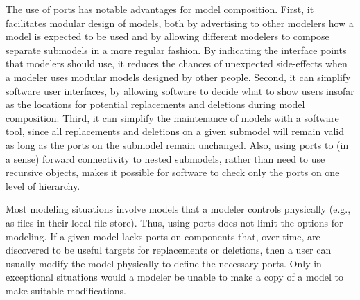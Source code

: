 The use of ports has notable advantages for model composition.  First,
it facilitates modular design of models, both by advertising to other
modelers how a model is expected to be used and by allowing different
modelers to compose separate submodels in a more regular fashion.  By
indicating the interface points that modelers should use, it reduces the
chances of unexpected side-effects when a modeler uses modular models
designed by other people.  Second, it can simplify software user
interfaces, by allowing software to decide what to show users insofar as
the locations for potential replacements and deletions during model
composition.  Third, it can simplify the maintenance of models with a
software tool, since all replacements and deletions on a given submodel
will remain valid as long as the ports on the submodel remain unchanged.
Also, using ports to (in a sense) forward connectivity to nested
submodels, rather than need to use recursive \SBaseRef objects, makes it
possible for software to check only the ports on one level of hierarchy.

Most modeling situations involve models that a modeler controls
physically (e.g., as files in their local file store).  Thus, using ports
does not limit the options for modeling.  If a given model lacks ports
on components that, over time, are discovered to be useful targets for
replacements or deletions, then a user can usually modify the model
physically to define the necessary ports.  Only in exceptional
situations would a modeler be unable to make a copy of a model to make
suitable modifications.


%



